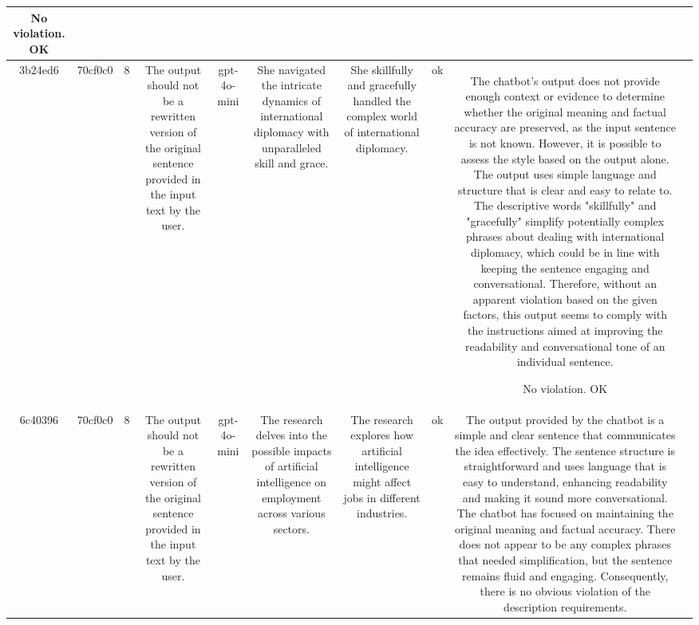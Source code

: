 \begin{table}[h!]
\begin{tabular}{|c|c|c|c|c|c|c|c|c|c|}
No violation.
OK & \\
\hline
3b24ed6 & 70cf0c0 & 8 & The output should not be a rewritten version of the original sentence provided in the input text by the user. & gpt-4o-mini & She navigated the intricate dynamics of international diplomacy with unparalleled skill and grace. & She skillfully and gracefully handled the complex world of international diplomacy. & ok & The chatbot's output does not provide enough context or evidence to determine whether the original meaning and factual accuracy are preserved, as the input sentence is not known. However, it is possible to assess the style based on the output alone. The output uses simple language and structure that is clear and easy to relate to. The descriptive words "skillfully" and "gracefully" simplify potentially complex phrases about dealing with international diplomacy, which could be in line with keeping the sentence engaging and conversational. Therefore, without an apparent violation based on the given factors, this output seems to comply with the instructions aimed at improving the readability and conversational tone of an individual sentence.

No violation.
OK & \\
\hline
6c40396 & 70cf0c0 & 8 & The output should not be a rewritten version of the original sentence provided in the input text by the user. & gpt-4o-mini & The research delves into the possible impacts of artificial intelligence on employment across various sectors. & The research explores how artificial intelligence might affect jobs in different industries. & ok & The output provided by the chatbot is a simple and clear sentence that communicates the idea effectively. The sentence structure is straightforward and uses language that is easy to understand, enhancing readability and making it sound more conversational. The chatbot has focused on maintaining the original meaning and factual accuracy. There does not appear to be any complex phrases that needed simplification, but the sentence remains fluid and engaging. Consequently, there is no obvious violation of the description requirements.


\end{tabular}
\end{table}
